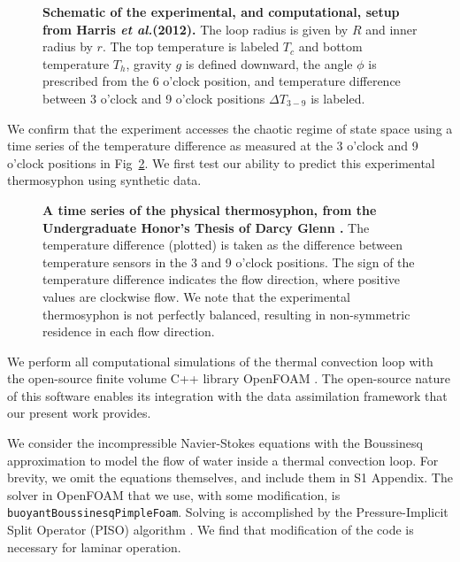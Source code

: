 \documentclass[10pt,letterpaper]{article}
\newcommand{\etal}{\textit{et al.}}
\begin{document}
\begin{figure}[h]
  \centering
  \caption[Schematic of the experimental, and computational, setup from Harris \etal (2012)]{
\textbf{    Schematic of the experimental, and computational, setup from Harris \etal (2012).
}    The loop radius is given by $R$ and inner radius by $r$.
    The top temperature is labeled $T_c$ and bottom temperature $T_h$, gravity $g$ is defined downward, the angle $\phi$ is prescribed from the 6 o'clock position, and temperature difference between 3 o'clock and 9 o'clock positions $\Delta T_{3-9}$ is labeled.
  }
  \label{fig:thermosyphon-schematic}
\end{figure}

We confirm that the experiment accesses the chaotic regime of state space using a time series of the temperature difference as measured at the 3 o'clock and 9 o'clock positions in Fig~\ref{fig:thermosyphon-physical-timeseries}.
We first test our ability to predict this experimental thermosyphon using synthetic data.

\begin{figure}[h]
  \centering
  \caption[A time series of the physical thermosyphon, from the Undergraduate Honor's Thesis of Darcy Glenn {\protect \cite{glenn2013}}]{
\textbf{    A time series of the physical thermosyphon, from the Undergraduate Honor's Thesis of Darcy Glenn {\protect \cite{glenn2013}}.
}    The temperature difference (plotted) is taken as the difference between temperature sensors in the 3 and 9 o'clock positions.
     The sign of the temperature difference indicates the flow direction, where positive values are clockwise flow.
     We note that the experimental thermosyphon is not perfectly balanced, resulting in non-symmetric residence in each flow direction.
      }
  \label{fig:thermosyphon-physical-timeseries}
\end{figure}

We perform all computational simulations of the thermal convection loop with the open-source finite volume C++ library OpenFOAM \cite{jasak2007}.
The open-source nature of this software enables its integration with the data assimilation framework that our present work provides.

We consider the incompressible Navier-Stokes equations with the Boussinesq approximation to model the flow of water inside a thermal convection loop.
For brevity, we omit the equations themselves, and include them in S1 Appendix.
The solver in OpenFOAM that we use, with some modification, is \verb|buoyantBoussinesqPimpleFoam|.
Solving is accomplished by the Pressure-Implicit Split Operator (PISO) algorithm \cite{issa1986solution}.
We find that modification of the code is necessary for laminar operation.
\end{document}
